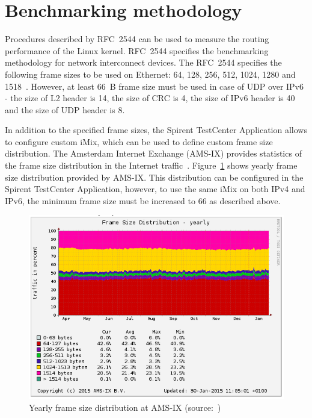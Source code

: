 
\section{Benchmarking methodology}\label{sec:analysis-metodology}
Procedures described by RFC~2544 can be used to measure the routing performance of the Linux kernel.
RFC~2544 specifies the benchmarking methodology for network interconnect devices.
The RFC~2544 specifies the following frame sizes to be used on Ethernet:
64, 128, 256, 512, 1024, 1280 and 1518~\cite{rfc2544}.
However, at least 66~B frame size must be used in case of UDP over IPv6 - the size of L2 header is 14,
the size of CRC is 4, the size of IPv6 header is 40 and the size of UDP header is 8.

In addition to the specified frame sizes, the Spirent TestCenter Application allows to configure custom iMix,
which can be used to define custom frame size distribution.
The Amsterdam Internet Exchange (AMS-IX) provides
statistics of the frame size distribution in the Internet traffic~\cite{amsix-frame-size}.
Figure~\ref{fig:analysis-amsix-frame-size} shows yearly frame size distribution provided by AMS-IX.
This distribution can be configured in the Spirent TestCenter Application, however,
to use the same iMix on both IPv4 and IPv6, the minimum frame size must be increased to 66 as described above.
\begin{figure}
	\centering
	\includegraphics[width=14.5cm,keepaspectratio]{fig/amsix.png}
	\caption{Yearly frame size distribution at AMS-IX (source:~\cite{amsix-frame-size})}
	\label{fig:analysis-amsix-frame-size}
\end{figure}

